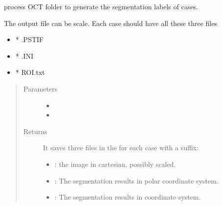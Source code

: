 \documentclass[letterpaper,10pt,english]{sphinxmanual}
\begin{document}
\begin{fulllineitems}
\label{\detokenize{index:util.process_oct_folder.process_oct_folder}}
process OCT folder to generate the segmentation labels of cases.

The  output file can be scale.  Each case should have all these three files
\begin{itemize}
\item {} 
* .PSTIF

\item {} 
* .INI

\item {} 
* ROI.txt

\end{itemize}
\begin{quote}\begin{description}
\item[{Parameters}] \leavevmode\begin{itemize}
\item {} 
 \textendash{} 

\item {} 
 \textendash{} 

\end{itemize}

\item[{Returns}] \leavevmode

It saves three files in the  for each case with a suffix:
\begin{itemize}
\item {} 
: the image in cartesian, possibly scaled.

\item {} 
: The segmentation results in polar coordinate system.

\item {} 
: The segmentation results in  coordinate system.

\end{itemize}


\end{description}\end{quote}



\end{fulllineitems}
\end{document}
